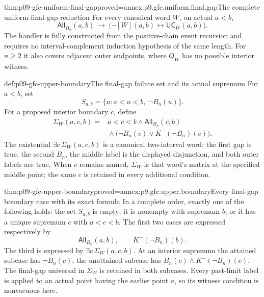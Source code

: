 \begin{hblemma}{thm:p09-gfc-uniform-final-gap}{proved=annex:p9.gfc.uniform.final.gap}{The complete uniform-final-gap reduction}
For every canonical word \(W\), on actual \(a<b\),
\[
 \mathsf{All}_{B_n}(a,b)\ \longrightarrow\
             \bigl(\neg[W](a,b)\longleftrightarrow
                         \mathsf{UC}_W(a,b)\bigr).
\]
The handler is fully constructed from the positive-chain
event recursion and requires no interval-complement
induction hypothesis of the same length.
For \(n\geq2\) it also covers adjacent outer endpoints,
where \(Q_W\) has no possible interior witness.
\end{hblemma}

\begin{hbdefinition}{def:p09-gfc-upper-boundary}{The final-gap failure set and its actual supremum}
For \(a<b\), set
\[
                 S_{a,b}=\{u:a<u<b,\ \neg B_n(u)\}.
\]
For a proposed interior boundary \(c\), define
\[
\begin{split}
 \Sigma_W(a,c,b)={}&a<c<b\land
               \mathsf{All}_{B_n}(c,b)\\
       &{}\land\bigl(\neg B_n(c)\lor K^-(\neg B_n)(c)\bigr).
\end{split}
\]
The existential \(\exists c\,\Sigma_W(a,c,b)\) is a
canonical two-interval word: the first gap is true, the
second \(B_n\), the middle label is the displayed
disjunction, and both outer labels are true. When \(c\)
remains named, \(\Sigma_W\) is that word's matrix at
the specified middle point; the same \(c\) is retained
in every additional condition.
\end{hbdefinition}

\begin{hblemma}{thm:p09-gfc-upper-boundary}{proved=annex:p9.gfc.upper.boundary}{Every final-gap boundary case with its exact formula}
In a complete order, exactly one of the following holds:
the set \(S_{a,b}\) is empty; it is nonempty with supremum
\(b\); or it has a unique supremum \(c\) with \(a<c<b\).
The first two cases are expressed respectively by
\[
              \mathsf{All}_{B_n}(a,b),\qquad
              K^-(\neg B_n)(b).
\]
The third is expressed by \(\exists c\,\Sigma_W(a,c,b)\).
At an interior supremum the attained subcase has
\(\neg B_n(c)\); the unattained subcase has
\(B_n(c)\land K^-(\neg B_n)(c)\).
The final-gap universal in \(\Sigma_W\) is retained
in both subcases. Every past-limit label is applied
to an actual point having the earlier point \(a\),
so its witness condition is nonvacuous here.
\end{hblemma}


